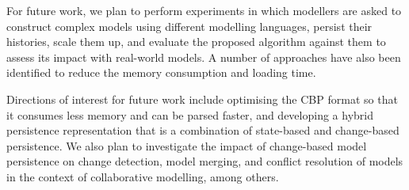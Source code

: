 \documentclass{llncs}
\begin{document}
For future work, we plan to perform experiments in which modellers are asked to construct complex models using different modelling languages, persist their histories, scale them up, and evaluate the proposed algorithm against them to assess its impact with real-world models. 
A number of approaches have also been identified to reduce the memory consumption and loading time.

Directions of interest for future work include optimising the CBP format so that it consumes less memory and can be parsed faster, and developing a hybrid persistence representation that is a combination of state-based and change-based persistence. We also plan to investigate the impact of change-based model persistence on change detection, model merging, and conflict resolution of models in the context of collaborative modelling, among others.

\clearpage
 

\end{document}
